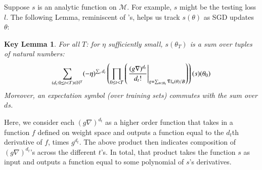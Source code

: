 \documentclass[final,12pt]{colt2021} %
\newtheorem*{klem*}{Key Lemma}
\newcommand{\wrap}[1]{\left(#1\right)}
\newcommand{\Bb}{\mathcal{B}}
\newcommand{\Mm}{\mathcal{M}}
\begin{document}
            Suppose $s$ is an analytic function on $\Mm$.  For example, $s$
            might be the testing loss $l$.  The following Lemma, reminiscent of
            \cite{dy49a}'s, helps us track $s(\theta)$ as SGD updates $\theta$:
            \begin{klem*} \label{lem:dyson}
                For all $T$: for $\eta$ sufficiently small, $s(\theta_T)$ is a sum
                over tuples of natural numbers:
                \begin{equation}\label{eq:dyson}
                    \sum_{(d_t: 0\leq t<T) \in \NN^T}
                    (-\eta)^{\sum_t d_t}
                    \wrap{
                        \prod_{0 \leq t < T}
                            \wrap{\left.
                                \frac{(g \nabla)^{d_t}}{d_t!}
                            \right|_{g = \sum_{n\in \Bb_t} \nabla l_n(\theta) / B}}
                    }(s) (\theta_0)
                \end{equation}
                Moreover, an expectation symbol (over training sets) commutes
                with the sum over $d$s.
            \end{klem*}
            Here, we consider each $(g \nabla)^{d_t}$ as a higher order
            function that takes in a function $f$ defined on weight space and
            outputs a function equal to the $d_t$th derivative of $f$, times
            $g^{d_t}$.  The above product then indicates composition of $(g
            \nabla)^{d_t}$'s across the different $t$'s.  In total, that
            product takes the function $s$ as input and outputs a function
            equal to some polynomial of $s$'s derivatives.
\end{document}
